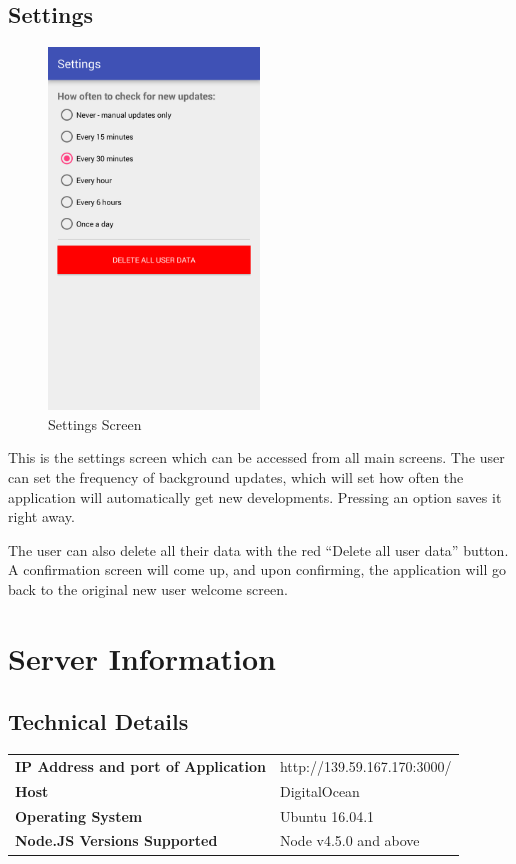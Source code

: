 \documentclass[11pt,titlepage]{report}
\begin{document}
\section{Settings}
\begin{figure}
	\vspace{-1cm}
	\begin{center}
		\includegraphics[width=0.5\textwidth]{img/settingsScreen.png}
	\end{center}
	\caption{Settings Screen}
	\vspace{-2.5cm}
\end{figure}
This is the settings screen which can be accessed from all main screens. The user can set the frequency of background updates, which will set how often the application will automatically get new developments. Pressing an option saves it right away. 

The user can also delete all their data with the red ``Delete all user data'' button. A confirmation screen will come up, and upon confirming, the application will go back to the original new user welcome screen. 

\chapter{Server Information}\label{appendix:serverInfo}
\section{Technical Details}
\renewcommand{\arraystretch}{1.5}
\begin{tabular}{>{\bfseries}l l}
IP Address and port of Application & http://139.59.167.170:3000/ \\
Host & DigitalOcean \\
Operating System & Ubuntu 16.04.1 \\
Node.JS Versions Supported & Node v4.5.0 and above
\end{tabular}
\end{document}
